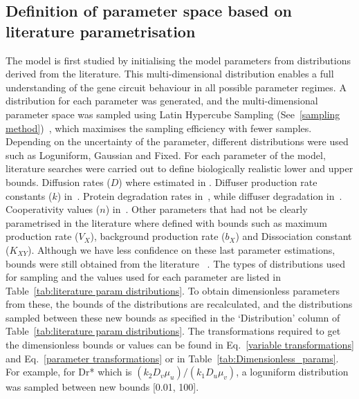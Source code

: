 \subsection{Definition of parameter space based on literature parametrisation}\label{Definition of parameter space based on literature parametrisation}
The model is first studied by initialising the model parameters from distributions derived from the literature.
This multi-dimensional distribution enables a full understanding of the gene circuit behaviour in all possible parameter regimes.
A distribution for each parameter was generated, and the multi-dimensional parameter space was sampled using Latin Hypercube Sampling (See~\ref{sampling method})~\parencite{Iman2014, Bergstra2012}, which maximises the sampling efficiency with fewer samples.
Depending on the uncertainty of the parameter, different distributions were used such as Loguniform, Gaussian and Fixed.
 For each parameter of the model, literature searches were carried out to define biologically realistic lower and upper bounds.
Diffusion rates ($D$) where estimated in .%
Diffuser production rate constants ($k$) in~\cite{Schaefer1996, Pai2009}.
Protein degradation rates in~\cite{Andersen1998}, while diffuser degradation in~\cite{kaufmann2005revisiting}.
Cooperativity values ($n$) in~\cite{Babic2007}.
Other parameters that had not be clearly parametrised in the literature where defined with bounds such as maximum production rate ($V_{X}$), background production rate ($b_{X}$) and Dissociation constant ($K_{XY}$). Although we have less confidence on these last parameter estimations, bounds were still obtained from the literature ~\parencite{Scholes2019, Pusnik2019}.
The types of distributions used for sampling and the values used for each parameter are listed in Table~\ref{tab:literature param distributions}.
To obtain dimensionless parameters from these, the bounds of the distributions are recalculated, and the distributions sampled between these new bounds as specified in the ‘Distribution’ column of Table~\ref{tab:literature param distributions}.
The transformations required to get the dimensionless bounds or values can be found in Eq.~\ref{variable transformations} and Eq.~\ref{parameter transformations} or in Table~\ref{tab:Dimensionless_params}.
For example, for Dr* which is $(k_{2}D_{v}\mu_{u})/(k_{1}D_{u}\mu_{v})$, a loguniform distribution was sampled between new bounds [0.01, 100].
